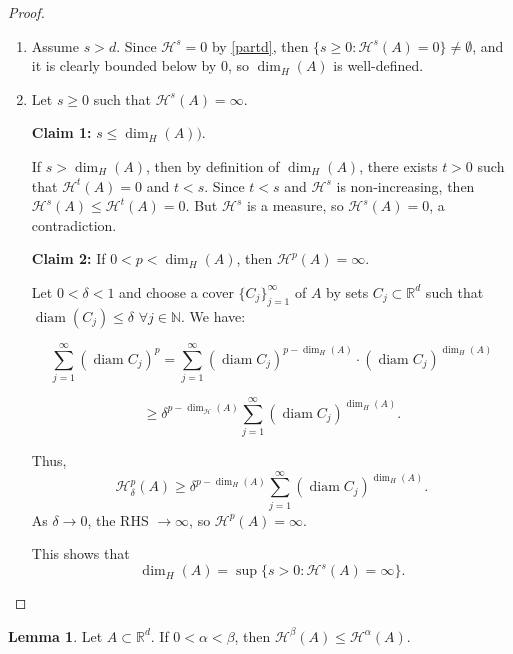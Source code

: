 \documentclass[12pt,a4paper]{report}
\theoremstyle{definition}
\newtheorem{lemma}{Lemma}
\begin{document}
\begin{proof}
\begin{enumerate}
\item Assume \( s > d \). Since \( \mathcal{H}^s = 0 \) by \ref{partd}, then \( \{ s \geq 0 : \mathcal{H}^s(A) = 0 \} \neq \emptyset \), and it is clearly bounded below by 0, so \( \dim_{H}(A) \) is well-defined.

\item Let \( s \geq 0 \) such that \( \mathcal{H}^s(A) = \infty \).

\textbf{Claim 1: } \( s \leq \dim_H(A)) \).

If \( s > \dim_H(A) \), then by definition of \( \dim_H(A) \), there exists \( t > 0 \) such that \( \mathcal{H}^t(A) = 0 \) and \( t < s \). Since \( t < s \) and \( \mathcal{H}^s \) is non-increasing, then \( \mathcal{H}^s(A) \leq \mathcal{H}^t(A) = 0 \). But \( \mathcal{H}^s \) is a measure, so \( \mathcal{H}^s(A) = 0 \), a contradiction.

\textbf{Claim 2: }
If \( 0 < p < \dim_H(A) \), then \( \mathcal{H}^p(A) = \infty \).

Let \( 0 < \delta < 1 \) and choose a cover \( \{ C_j \}_{j=1}^\infty \) of \( A \) by sets \( C_j \subset \mathbb{R}^d \) such that \( \operatorname{diam}(C_j) \leq \delta \,\, \forall j \in \mathbb{N} \). We have:

\[
\sum_{j=1}^\infty (\operatorname{diam} C_j)^p =
\sum_{j=1}^\infty (\operatorname{diam} C_j)^{p - \dim_H(A)} \cdot (\operatorname{diam} C_j)^{\dim_H(A)}
\]

\[
\geq \delta^{p - \dim_{\mathcal{H}}(A)} \sum_{j=1}^\infty (\operatorname{diam} C_j)^{\dim_H(A)}.
\]

Thus,
\[
\mathcal{H}^p_\delta(A) \geq \delta^{p - \dim_H(A)} \sum_{j=1}^\infty (\operatorname{diam} C_j)^{\dim_H(A)}.
\]
As \( \delta \to 0 \), the RHS \( \to \infty \), so \( \mathcal{H}^p(A) = \infty \).

This shows that
\[
\dim_H(A) = \sup \{ s > 0 : \mathcal{H}^s(A) = \infty \}.
\]
\end{enumerate}
\end{proof}


\begin{lemma}
Let \( A \subset \mathbb{R}^d \). If \( 0 < \alpha < \beta \), then
$\mathcal{H}^\beta(A) \leq \mathcal{H}^\alpha(A).$
\end{lemma}
\end{document}
